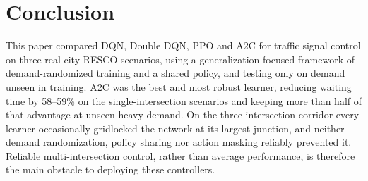 \section{Conclusion}
\label{sec:conclusion}

This paper compared DQN, Double DQN, PPO and A2C for traffic signal control on three real-city RESCO scenarios, using a generalization-focused framework of demand-randomized training and a shared policy, and testing only on demand unseen in training. A2C was the best and most robust learner, reducing waiting time by 58--59\% on the single-intersection scenarios and keeping more than half of that advantage at unseen heavy demand. On the three-intersection corridor every learner occasionally gridlocked the network at its largest junction, and neither demand randomization, policy sharing nor action masking reliably prevented it. Reliable multi-intersection control, rather than average performance, is therefore the main obstacle to deploying these controllers.
